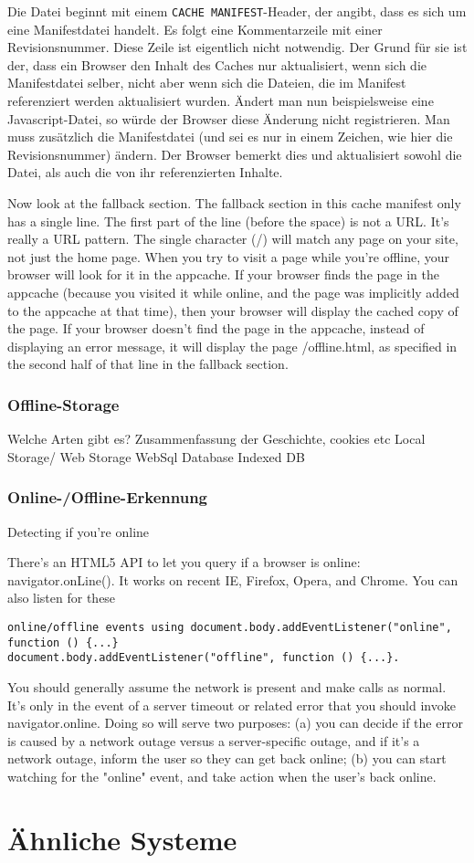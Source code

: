 Die Datei beginnt mit einem \texttt{CACHE MANIFEST}-Header, der angibt, dass es sich um eine Manifestdatei handelt. Es folgt eine Kommentarzeile mit einer Revisionsnummer. Diese Zeile ist eigentlich nicht notwendig. Der Grund für sie ist der, dass ein Browser den Inhalt des Caches nur aktualisiert, wenn sich die Manifestdatei selber, nicht aber wenn sich die Dateien, die im Manifest referenziert werden aktualisiert wurden. Ändert man nun beispielsweise eine Javascript-Datei, so würde der Browser diese Änderung nicht registrieren. Man muss zusätzlich die Manifestdatei (und sei es nur in einem Zeichen, wie hier die Revisionsnummer) ändern. Der Browser bemerkt dies und aktualisiert sowohl die Datei, als auch die von ihr referenzierten Inhalte.

Now look at the fallback section. The fallback section in this cache manifest only has a single line. The first part of the line (before the space) is not a URL. It’s really a URL pattern. The single character (/) will match any page on your site, not just the home page. When you try to visit a page while you’re offline, your browser will look for it in the appcache. If your browser finds the page in the appcache (because you visited it while online, and the page was implicitly added to the appcache at that time), then your browser will display the cached copy of the page. If your browser doesn’t find the page in the appcache, instead of displaying an error message, it will display the page /offline.html, as specified in the second half of that line in the fallback section. 


\cite{w3c_offline_appcache}
\cite{html5_up_and_running}
\cite{html5_rocks_appcache_leitfaden}

\subsubsection{Offline-Storage}\label{section:local_storage}
Welche Arten gibt es? Zusammenfassung der Geschichte, cookies etc
Local Storage/ Web Storage
\cite{html5_up_and_running}
WebSql Database
Indexed DB

\subsubsection{Online-/Offline-Erkennung}
Detecting if you're online

There's an HTML5 API to let you query if a browser is online: navigator.onLine(). It works on recent IE, Firefox, Opera, and Chrome. You can also listen for these
\begin{lstlisting}
online/offline events using document.body.addEventListener("online", function () {...} 
document.body.addEventListener("offline", function () {...}.
\end{lstlisting}
You should generally assume the network is present and make calls as normal. It's only in the event of a server timeout or related error that you should invoke navigator.online. Doing so will serve two purposes: (a) you can decide if the error is caused by a network outage versus a server-specific outage, and if it's a network outage, inform the user so they can get back online; (b) you can start watching for the "online" event, and take action when the user's back online.

\section{Ähnliche Systeme}